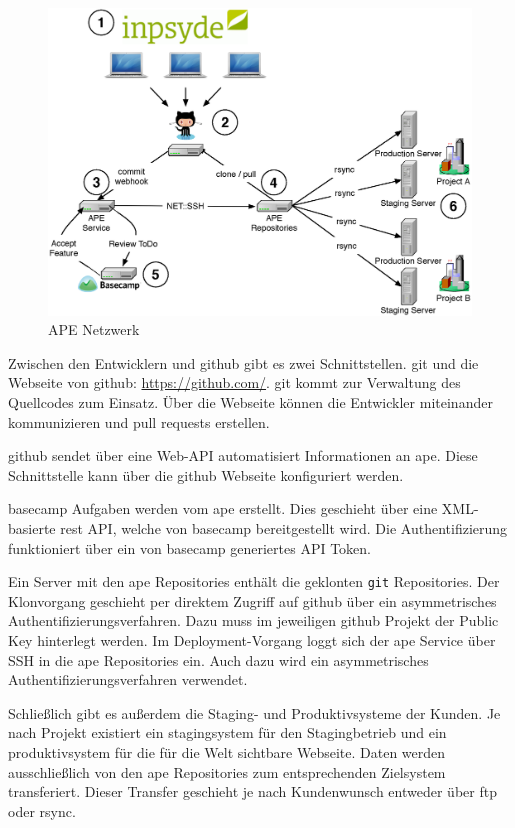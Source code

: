 \begin{figure}
	\includegraphics[width=1.0\textwidth]{assets/ape_network.eps}
	\caption{APE Netzwerk}
	\label{fig:ape_network}
\end{figure}

Zwischen den Entwicklern und \gls{github} gibt es zwei Schnittstellen. \gls{git} und die Webseite von \gls{github}: \url{https://github.com/}. \gls{git} kommt zur Verwaltung des Quellcodes zum Einsatz. Über die Webseite können die Entwickler miteinander kommunizieren und \glspl{pull request} erstellen.

\gls{github} sendet über eine Web-API automatisiert Informationen an \gls{ape}. Diese Schnittstelle kann über die \gls{github} Webseite konfiguriert werden.

\gls{basecamp} Aufgaben werden vom \gls{ape} erstellt. Dies geschieht über eine XML-basierte \gls*{rest} API, welche von \gls{basecamp} bereitgestellt wird. Die Authentifizierung funktioniert über ein von \gls{basecamp} generiertes API Token.

Ein Server mit den \gls{ape} Repositories enthält die geklonten \lstinline!git! Repositories. Der Klonvorgang geschieht per direktem Zugriff auf \gls{github} über ein asymmetrisches Authentifizierungsverfahren. Dazu muss im jeweiligen \gls{github} Projekt der Public Key hinterlegt werden. Im Deployment-Vorgang loggt sich der \gls{ape} Service über SSH in die \gls{ape} Repositories ein. Auch dazu wird ein asymmetrisches Authentifizierungsverfahren verwendet.

Schließlich gibt es außerdem die Staging- und Produktivsysteme der Kunden. Je nach Projekt existiert ein \gls{stagingsystem} für den Stagingbetrieb und ein \gls{produktivsystem} für die für die Welt sichtbare Webseite. Daten werden ausschließlich von den \gls{ape} Repositories zum entsprechenden Zielsystem transferiert. Dieser Transfer geschieht je nach Kundenwunsch entweder über \gls{ftp} oder \gls{rsync}.

